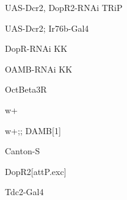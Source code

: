 \documentclass[17pt]{extarticle}
\begin{document}
\newpage\vspace*{-0.15cm}
\begin{footnotesize}
UAS-Dcr2, DopR2-RNAi TRiP \\[0.5em]
\end{footnotesize}
\footnotesize
\newpage\vspace*{-0.15cm}
\begin{footnotesize}
UAS-Dcr2; Ir76b-Gal4 \\[0.5em]
\end{footnotesize}
\footnotesize
\newpage\vspace*{-0.15cm}
\begin{normalsize}
DopR-RNAi KK \\[0.5em]
\end{normalsize}
\footnotesize
\newpage\vspace*{-0.15cm}
\begin{normalsize}
OAMB-RNAi KK \\[0.5em]
\end{normalsize}
\footnotesize
\newpage\vspace*{-0.15cm}
\begin{large}
OctBeta3R \\[0.5em]
\end{large}
\footnotesize
\newpage\vspace*{-0.15cm}
\begin{large}
w+ \\[0.5em]
\end{large}
\footnotesize
\newpage\vspace*{-0.15cm}
\begin{normalsize}
w+;; DAMB[1] \\[0.5em]
\end{normalsize}
\footnotesize
\newpage\vspace*{-0.15cm}
\begin{large}
Canton-S \\[0.5em]
\end{large}
\footnotesize
\newpage\vspace*{-0.15cm}
\begin{normalsize}
DopR2[attP.exc] \\[0.5em]
\end{normalsize}
\footnotesize
\newpage\vspace*{-0.15cm}
\begin{large}
Tdc2-Gal4 \\[0.5em]
\end{large}
\footnotesize
\newpage\vspace*{-0.15cm}
\end{document}

